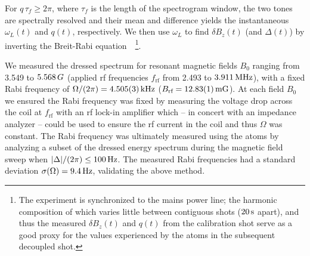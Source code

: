 \documentclass[aps,prl,reprint,superscriptaddress,floatfix]{revtex4-1}
\begin{document}
For $q \, \tau_f \geq 2\pi$, where $\tau_f$ is the length of the spectrogram window, the two tones are spectrally resolved and their mean and difference yields the instantaneous $\omega_L(t)$ and $q(t)$, respectively.
We then use $\omega_L$ to find $\delta B_z(t)$ (and $\Delta(t)$) by inverting the Breit-Rabi equation~\cite{ramsey_molecular_1956}~\footnote{
    The experiment is synchronized to the mains power line; the harmonic composition of which varies little between contiguous shots ($\unit[20]{s}$ apart), and thus the measured $\delta B_z(t)$ and $q(t)$ from the calibration shot serve as a good proxy for the values experienced by the atoms in the subsequent decoupled shot.
}.

We measured the dressed spectrum for resonant magnetic fields $B_0$ ranging from 3.549 to $\unit[5.568]\unit{G}$ (applied rf frequencies $f_{\text{rf}}$ from 2.493 to $\unit[3.911]{MHz}$), with a fixed Rabi frequency of $\Omega/(2\pi) = \unit[4.505(3)]{kHz}$ ($B_{\text{rf}} = \unit[12.83(1)]{mG}$).
At each field $B_0$ we ensured the Rabi frequency was fixed by measuring the voltage drop across the coil at $f_{\text{rf}}$ with an rf lock-in amplifier which -- in concert with an impedance analyzer -- could be used to ensure the rf current in the coil and thus $\Omega$ was constant.
The Rabi frequency was ultimately measured using the atoms by analyzing a subset of the dressed energy spectrum during the magnetic field sweep when $\abs{\Delta}/(2\pi) \leq \unit[100]{Hz}$.
The measured Rabi frequencies had a standard deviation $\sigma(\Omega) = \unit[9.4]{Hz}$, validating the above method.
\end{document}
